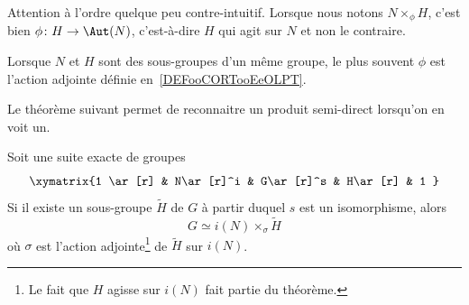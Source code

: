 \begin{normaltext}		\label{NORMooTPBGooIdQskM}
	Attention à l'ordre quelque peu contre-intuitif. Lorsque nous notons \( N\times_{\phi}H\), c'est bien \( \phi\colon H\to \Aut(N)\), c'est-à-dire \( H\) qui agit sur \( N\) et non le contraire.

	Lorsque \( N\) et \( H\) sont des sous-groupes d'un même groupe, le plus souvent \( \phi\) est l'action adjointe définie en~\ref{DEFooCORTooEeOLPT}.
\end{normaltext}

Le théorème suivant permet de reconnaitre un produit semi-direct lorsqu'on en voit un.
\begin{theorem}       \label{THOooZNYTooPhnIdE}
	Soit une suite exacte de groupes
	\begin{equation}
		\xymatrix{%
			1 \ar[r] & N\ar[r]^i & G\ar[r]^s & H\ar[r] & 1
		}
	\end{equation}
	Si il existe un sous-groupe \( \tilde H\) de \( G\) à partir duquel \( s\) est un isomorphisme, alors
	\begin{equation}
		G\simeq i(N)\times_{\sigma}\tilde H
	\end{equation}
	où \( \sigma\) est l'action adjointe\footnote{Le fait que \( H\) agisse sur \( i(N)\) fait partie du théorème.} de \( \tilde H\) sur \( i(N)\).
\end{theorem}

